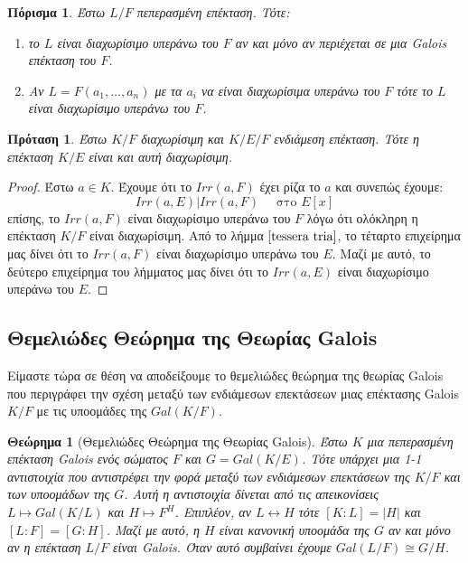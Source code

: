 \documentclass[oneside,a4paper]{article}
\newtheorem{theorem}{Θεώρημα}
\newtheorem{prop}{Πρόταση}
\newtheorem{cor}{Πόρισμα}
\newcommand {\tl}{\textlatin}
\begin{document}
\begin{cor} Έστω $L/F$ πεπερασμένη επέκταση. Τότε:
	\begin{enumerate}
		\item το $L$ είναι διαχωρίσιμο υπεράνω του $F$ αν και μόνο αν περιέχεται σε μια \tl{Galois} επέκταση του $F$.
		\item Αν $L = F(a_1, \ldots , a_n)$ με τα $a_i$ να είναι διαχωρίσιμα υπεράνω του $F$ τότε το $L$ είναι διαχωρίσιμο υπεράνω του $F$.
	\end{enumerate}
\end{cor}

\begin{prop}
	\label{myprop}
	Έστω $K/F$ διαχωρίσιμη και $K/E/F$ ενδιάμεση επέκταση. Τότε η επέκταση $K/E$ είναι και αυτή διαχωρίσιμη.
\end{prop}
\begin{proof}
	Έστω $a \in K$. Έχουμε ότι το $Irr(a,F)$ έχει ρίζα το $a$ και συνεπώς έχουμε:
	$$Irr(a,E) | Irr(a,F) \quad \text{ στο } E[x]$$
	επίσης, το $Irr(a,F)$ είναι διαχωρίσιμο υπεράνω του $F$ λόγω ότι ολόκληρη η επέκταση $K/F$ είναι διαχωρίσιμη. Από το λήμμα $\ref{tessera tria}$, το τέταρτο επιχείρημα μας δίνει ότι το $Irr(a,F)$ είναι διαχωρίσιμο υπεράνω του $E$. Μαζί με αυτό, το δεύτερο επιχείρημα του λήμματος μας δίνει ότι το $Irr(a,E)$ είναι διαχωρίσιμο υπεράνω του $E$.
\end{proof}

\pagebreak
\subsection{Θεμελιώδες Θεώρημα της Θεωρίας \tl{Galois}}

Είμαστε τώρα σε θέση να αποδείξουμε το θεμελιώδες θεώρημα της θεωρίας \tl{Galois} που περιγράφει την σχέση μεταξύ των ενδιάμεσων επεκτάσεων μιας επέκτασης \tl{Galois} $K/F$ με τις υποομάδες της $Gal(K/F)$.

\begin{theorem}[Θεμελιώδες Θεώρημα της Θεωρίας \tl{Galois}]
	Έστω $K$ μια πεπερασμένη επέκταση \tl{Galois} ενός σώματος $F$ και $G=Gal(K/E)$. Τότε υπάρχει μια 1-1 αντιστοιχία που αντιστρέφει την φορά μεταξύ των ενδιάμεσων επεκτάσεων της $K/F$ και των υποομάδων της $G$. Αυτή η αντιστοιχία δίνεται από τις απεικονίσεις $L \mapsto Gal(K/L)$ και $H \mapsto F^H$. Επιπλέον, αν $L\leftrightarrow H$ τότε $[K:L] = |H|$ και $[L:F] = [G:H]$. Μαζί με αυτό, η $H$ είναι κανονική υποομάδα της $G$ αν και μόνο αν η επέκταση $L/F$ είναι \tl{Galois}. Όταν αυτό συμβαίνει έχουμε $Gal(L/F) \cong G/H$.
\end{theorem}
\end{document}
